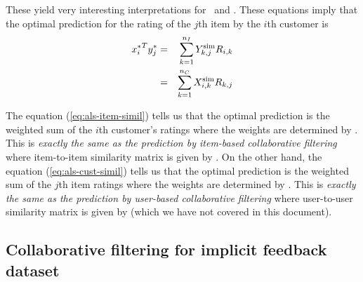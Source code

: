 These yield very interesting interpretations for \Xsim\ and \Ysim.
These equations imply that the optimal prediction for the rating of the $j$th item by the $i$th customer is
\begin{eqnarray}
\label{eq:als-item-simil}
{x_i^\ast}^T y_j^\ast &=& \sum_{k=1}^{{n_I}} Y^\mathrm{sim}_{k,j} R_{i,k}
\\
\label{eq:als-cust-simil}
&=& \sum_{k=1}^{{n_C}} X^\mathrm{sim}_{i,k} R_{k,j}
\end{eqnarray}

The equation (\ref{eq:als-item-simil}) tells us that
the optimal prediction is the weighted sum of the $i$th customer's ratings
where the weights are determined by \Ysim.
This is \emph{exactly the same as the prediction by item-based collaborative filtering}
where item-to-item similarity matrix is given by \Ysim.
On the other hand,
the equation (\ref{eq:als-cust-simil}) tells us that
the optimal prediction is the weighted sum of the $j$th item ratings
where the weights are determined by \Xsim.
This is \emph{exactly the same as the prediction by user-based collaborative filtering}
where user-to-user similarity matrix is given by \Xsim
(which we have not covered in this document).





\iffalse

\subsection{Regularization}

XXX: to be filled soon

\subsection{Generalized loss function}

XXX: to be filled soon


\subsection{Training, validation, and test strategy}

XXX: to be filled soon


\fi


\subsection{Collaborative filtering for implicit feedback dataset}

